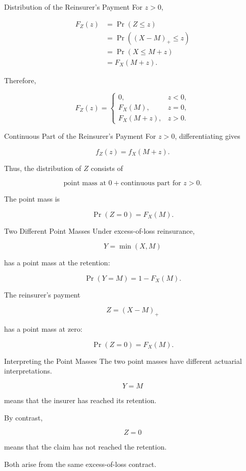 \documentclass[
  ignorenonframetext,
  aspectratio=169,
]{beamer}
\begin{document}
\begin{frame}{Distribution of the Reinsurer's Payment}
\protect{}\label{distribution-of-the-reinsurers-payment-1}
For \(z>0\),

\[
\begin{aligned}
F_Z(z)
&=\Pr(Z\leq z)\\
&=\Pr((X-M)_+\leq z)\\
&=\Pr(X\leq M+z)\\
&=F_X(M+z).
\end{aligned}
\]

Therefore,

\[
\boxed{
F_Z(z)=
\begin{cases}
0, & z<0,\\
F_X(M), & z=0,\\
F_X(M+z), & z>0.
\end{cases}
}
\]
\end{frame}

\begin{frame}{Continuous Part of the Reinsurer's Payment}
\protect{}\label{continuous-part-of-the-reinsurers-payment}
For \(z>0\), differentiating gives

\[
\boxed{
f_Z(z)=f_X(M+z).
}
\]

Thus, the distribution of \(Z\) consists of

\[
\boxed{
\text{point mass at }0
+
\text{continuous part for }z>0.
}
\]

The point mass is

\[
\Pr(Z=0)=F_X(M).
\]
\end{frame}

\begin{frame}{Two Different Point Masses}
\protect{}\label{two-different-point-masses-1}
Under excess-of-loss reinsurance,

\[
Y=\min(X,M)
\]

has a point mass at the retention:

\[
\boxed{
\Pr(Y=M)=1-F_X(M).
}
\]

The reinsurer's payment

\[
Z=(X-M)_+
\]

has a point mass at zero:

\[
\boxed{
\Pr(Z=0)=F_X(M).
}
\]
\end{frame}

\begin{frame}{Interpreting the Point Masses}
\protect{}\label{interpreting-the-point-masses}
The two point masses have different actuarial interpretations.

\[
Y=M
\]

means that the insurer has reached its retention.

By contrast,

\[
Z=0
\]

means that the claim has not reached the retention.

Both arise from the same excess-of-loss contract.
\end{frame}
\end{document}
